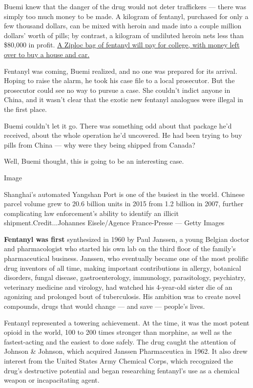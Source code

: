 Buemi knew that the danger of the drug would not deter traffickers ---
there was simply too much money to be made. A kilogram of fentanyl,
purchased for only a few thousand dollars, can be mixed with heroin and
made into a couple million dollars' worth of pills; by contrast, a
kilogram of undiluted heroin nets less than \$80,000 in profit.
\href{https://www.dea.gov/sites/default/files/2018-07/DIR-040-17_2017-NDTA.pdf}{A
Ziploc bag of fentanyl will pay for college, with money left over to buy
a house and car.}

Fentanyl was coming, Buemi realized, and no one was prepared for its
arrival. Hoping to raise the alarm, he took his case file to a local
prosecutor. But the prosecutor could see no way to pursue a case. She
couldn't indict anyone in China, and it wasn't clear that the exotic new
fentanyl analogues were illegal in the first place.

Buemi couldn't let it go. There was something odd about that package
he'd received, about the whole operation he'd uncovered. He had been
trying to buy pills from China --- why were they being shipped from
Canada?

Well, Buemi thought, this is going to be an interesting case.

Image

Shanghai's automated Yangshan Port is one of the busiest in the world.
Chinese parcel volume grew to 20.6 billion units in 2015 from 1.2
billion in 2007, further complicating law enforcement's ability to
identify an illicit shipment.Credit...Johannes Eisele/Agence
France-Presse --- Getty Images

\textbf{Fentanyl was first} synthesized in 1960 by Paul Janssen, a young
Belgian doctor and pharmacologist who started his own lab on the third
floor of the family's pharmaceutical business. Janssen, who eventually
became one of the most prolific drug inventors of all time, making
important contributions in allergy, botanical disorders, fungal disease,
gastroenterology, immunology, parasitology, psychiatry, veterinary
medicine and virology, had watched his 4-year-old sister die of an
agonizing and prolonged bout of tuberculosis. His ambition was to create
novel compounds, drugs that would change --- and save --- people's
lives.

Fentanyl represented a towering achievement. At the time, it was the
most potent opioid in the world, 100 to 200 times stronger than
morphine, as well as the fastest-acting and the easiest to dose safely.
The drug caught the attention of Johnson \& Johnson, which acquired
Janssen Pharmaceutica in 1962. It also drew interest from the United
States Army Chemical Corps, which recognized the drug's destructive
potential and began researching fentanyl's use as a chemical weapon or
incapacitating agent.

